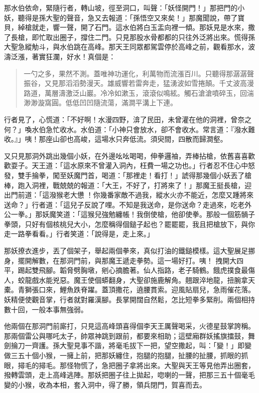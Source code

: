 那水伯依命，緊隨行者，轉山坡，徑至洞口，叫聲：「妖怪開門！」那把門的小妖，聽得是孫大聖的聲音，急又去報道：「孫悟空又來矣！」那魔聞說，帶了寶貝，綽槍就走，響一聲，開了石門。這水伯將白玉盂向裡一傾。那妖見是水來，撒了長槍，即忙取出圈子，撐住二門。只見那股水骨都都的只往外泛將出來。慌得孫大聖急縱觔斗，與水伯跳在高峰。那天王同眾都駕雲停於高峰之前，觀看那水，波濤泛漲，著實狂瀾，好水！真個是：
\begin{quote}
一勺之多，果然不測。蓋唯神功運化，利萬物而流漲百川。只聽得那潺潺聲振谷，又見那滔滔勢漫天。雄威響若雷奔走，猛湧波如雪捲顛。千丈波高漫路道，萬層濤激泛山巖。冷冷如漱玉，滾滾似鳴絃。觸石滄滄噴碎玉，回湍渺渺漩窩圓。低低凹凹隨流蕩，滿澗平溝上下連。
\end{quote}

行者見了，心慌道：「不好啊！水漫四野，渰了民田，未曾灌在他的洞裡，曾奈之何？」喚水伯急忙收水。水伯道：「小神只會放水，卻不會收水。常言道：『潑水難收。』」咦！那座山卻也高峻，這場水只奔低流。須臾間，四散而歸澗壑。

又只見那洞外跳出幾個小妖，在外邊吆吆喝喝，伸拳邏袖，弄棒拈槍，依舊喜喜歡歡耍子。天王道：「這水原來不曾灌入洞內，枉費一場之功也。」行者忍不住心中怒發，雙手掄拳，闖至妖魔門首，喝道：「那裡走！看打！」諕得那幾個小妖丟了槍棒，跑入洞裡，戰兢兢的報道：「大王，不好了，打將來了！」那魔王挺長槍，迎出門前道：「這潑猴老大憊𪬯！你幾番家敵不過我，縱水火亦不能近，怎麼又踵將來送命？」行者道：「這兒子反說了哩。不知是我送命，是你送命？走過來，吃老外公一拳。」那妖魔笑道：「這猴兒強勉纏帳！我倒使槍，他卻使拳。那般一個筋䯞子拳頭，只好有個核桃兒大小，怎麼稱得個鎚子起也？罷罷罷，我且把槍放下，與你走一路拳看看。」行者笑道：「說得是，走上來。」

那妖撩衣進步，丟了個架子，舉起兩個拳來，真似打油的鐵鎚模樣。這大聖展足挪身，擺開解數，在那洞門前，與那魔王遞走拳勢。這一場好打。咦！
拽開大四平，踢起雙飛腳。韜脅劈胸墩，剜心摘膽著。仙人指路，老子騎鶴。餓虎撲食最傷人，蛟龍戲水能兇惡。魔王使個蟒翻身，大聖卻施鹿解角。翹跟淬地龍，扭腕拿天橐。青獅張口來，鯉魚跌脊躍。蓋頂撒花，遶腰貫索。迎風貼扇兒，急雨催花落。妖精便使觀音掌，行者就對羅漢腳。長掌開闊自然鬆，怎比短拳多緊削。兩個相持數十回，一般本事無強弱。

他兩個在那洞門前廝打，只見這高峰頭喜得個李天王厲聲喝采，火德星鼓掌誇稱。那兩個雷公與哪吒太子，帥眾神跳到跟前，都要來相助；這壁廂群妖搖旗擂鼓，舞劍掄刀一齊護。孫大聖見事不諧，將毫毛拔下一把，望空撒起，叫：「變！」即變做三五十個小猴，一擁上前，把那妖纏住，抱腿的抱腿，扯腰的扯腰，抓眼的抓眼，撏毛的撏毛。那怪物慌了，急把圈子拿將出來。大聖與天王等見他弄出圈套，撥轉雲頭，走上高峰逃陣。那妖把圈子往上拋起，唿喇的一聲，把那三五十個毫毛變的小猴，收為本相，套入洞中，得了勝，領兵閉門，賀喜而去。

